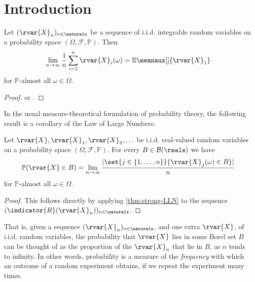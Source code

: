 \documentclass[article, a4paper, 11pt, oneside]{memoir}
\title{\doctitle}
\author{\docauthor}
\numberwithin{equation}{chapter}
\newcommand{\calB}{\mathcal{B}}
\newcommand{\calF}{\mathcal{F}}
\newcommand{\borel}[1]{\calB(#1)}
\renewcommand{\P}{\mathbb{P}}
\renewcommand{\mean}[2][]{\mathbb{E}\meanaux[#1]{#2}}
\DeclarePairedDelimiter{\card}{\lvert}{\rvert}
\begin{document}
\maketitle

\chapter{Introduction}

\begin{theorem}
    \label{thm:strong-LLN}
    Let $(\rvar{X}_n)_{n\in\naturals}$ be a sequence of i.i.d. integrable random variables on a probability space $(\Omega,\calF,\P)$. Then
    \begin{equation*}
        \lim_{n\to\infty} \frac{1}{n} \sum_{i=1}^n \rvar{X}_i(\omega)
            = \mean{\rvar{X}_1}
    \end{equation*}
    for $\P$-almost all $\omega \in \Omega$.
\end{theorem}

\begin{proof}
    \textcite[Theorem~12.1]{bauer1995} or \textcite[Theorem~22.1]{billingsley1995}.
\end{proof}

In the usual measure-theoretical formulation of probability theory, the following result is a corollary of the Law of Large Numbers:

\begin{theorem}
    Let $\rvar{X}, \rvar{X}_1, \rvar{X}_2, \ldots$ be i.i.d. real-valued random variables on a probability space $(\Omega, \calF, \P)$. For every $B \in \borel{\reals}$ we have
    \begin{equation*}
        \P(\rvar{X} \in B)
            = \lim_{n\to\infty} \frac{
                \card{ \set{j \in \{1, \ldots, n\} }{ \rvar{X}_j(\omega) \in B } }
            }{
                n
            }
    \end{equation*}
    for $\P$-almost all $\omega \in \Omega$.
\end{theorem}

\begin{proof}
    This follows directly by applying \cref{thm:strong-LLN} to the sequence $(\indicator{B}(\rvar{X}_n))_{n\in\naturals}$.
\end{proof}
%
That is, given a sequence $(\rvar{X}_n)_{n\in\naturals}$, and one extra $\rvar{X}$, of i.i.d. random variables, the probability that $\rvar{X}$ lies in some Borel set $B$ can be thought of as the proportion of the $\rvar{X}_n$ that lie in $B$, as $n$ tends to infinity. In other words, probability is a measure of the \emph{frequency} with which an outcome of a random experiment obtains, if we repeat the experiment many times.
\end{document}
